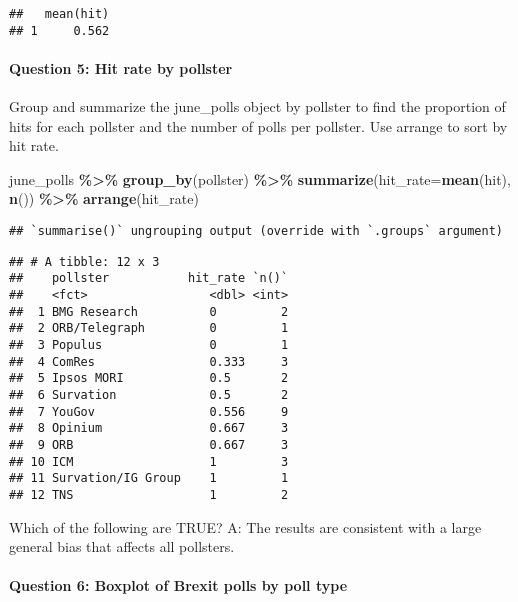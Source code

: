 \documentclass[
]{article}
\newenvironment{Shaded}{\begin{snugshade}}{\end{snugshade}}
\newcommand{\DataTypeTok}[1]{\textcolor[rgb]{0.13,0.29,0.53}{#1}}
\newcommand{\KeywordTok}[1]{\textcolor[rgb]{0.13,0.29,0.53}{\textbf{#1}}}
\newcommand{\NormalTok}[1]{#1}
\newcommand{\OperatorTok}[1]{\textcolor[rgb]{0.81,0.36,0.00}{\textbf{#1}}}
\newcommand{\StringTok}[1]{\textcolor[rgb]{0.31,0.60,0.02}{#1}}
\begin{document}
\begin{verbatim}
##   mean(hit)
## 1     0.562
\end{verbatim}

\hypertarget{question-5-hit-rate-by-pollster}{%
\paragraph{Question 5: Hit rate by
pollster}\label{question-5-hit-rate-by-pollster}}

Group and summarize the june\_polls object by pollster to find the
proportion of hits for each pollster and the number of polls per
pollster. Use arrange to sort by hit rate.

\begin{Shaded}
\begin{Highlighting}[]
\NormalTok{june\_polls }\OperatorTok{\%\textgreater{}\%}
\StringTok{  }\KeywordTok{group\_by}\NormalTok{(pollster) }\OperatorTok{\%\textgreater{}\%}
\StringTok{  }\KeywordTok{summarize}\NormalTok{(}\DataTypeTok{hit\_rate=}\KeywordTok{mean}\NormalTok{(hit), }\KeywordTok{n}\NormalTok{()) }\OperatorTok{\%\textgreater{}\%}
\StringTok{  }\KeywordTok{arrange}\NormalTok{(hit\_rate)}
\end{Highlighting}
\end{Shaded}

\begin{verbatim}
## `summarise()` ungrouping output (override with `.groups` argument)
\end{verbatim}

\begin{verbatim}
## # A tibble: 12 x 3
##    pollster           hit_rate `n()`
##    <fct>                 <dbl> <int>
##  1 BMG Research          0         2
##  2 ORB/Telegraph         0         1
##  3 Populus               0         1
##  4 ComRes                0.333     3
##  5 Ipsos MORI            0.5       2
##  6 Survation             0.5       2
##  7 YouGov                0.556     9
##  8 Opinium               0.667     3
##  9 ORB                   0.667     3
## 10 ICM                   1         3
## 11 Survation/IG Group    1         1
## 12 TNS                   1         2
\end{verbatim}

Which of the following are TRUE? A: The results are consistent with a
large general bias that affects all pollsters.

\hypertarget{question-6-boxplot-of-brexit-polls-by-poll-type}{%
\paragraph{Question 6: Boxplot of Brexit polls by poll
type}\label{question-6-boxplot-of-brexit-polls-by-poll-type}}
\end{document}
